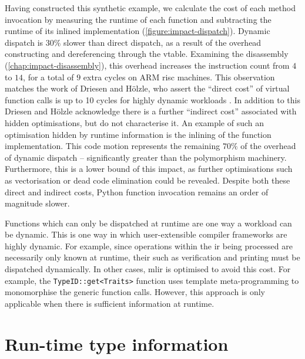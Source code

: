 Having constructed this synthetic example, we calculate the cost of each method invocation by measuring the runtime of each function and subtracting the runtime of its inlined implementation (\autoref{figure:impact-dispatch}).
Dynamic dispatch is $30\%$ slower than direct dispatch, as a result of the overhead constructing and dereferencing through the \ac{vtable}. Examining the disassembly (\autoref{chap:impact-disassembly}), this overhead increases the instruction count from $4$ to $14$, for a total of $9$ extra cycles on ARM \ac{risc} machines. This observation matches the work of Driesen and H\"olzle, who assert the ``direct cost'' of virtual function calls is up to 10 cycles for highly dynamic workloads \cite[Figure 18.]{driesenDirectCostVirtual1996}.
In addition to this Driesen and H\"olzle acknowledge there is a further ``indirect cost'' associated with hidden optimisations, but do not characterise it.
An example of such an optimisation hidden by runtime information is the inlining of the function implementation. This code motion represents the remaining $70\%$ of the overhead of dynamic dispatch -- significantly greater than the polymorphism machinery. Furthermore, this is a lower bound of this impact, as further optimisations such as vectorisation or dead code elimination could be revealed.
Despite both these direct and indirect costs, Python function invocation remains an order of magnitude slower.


Functions which can only be dispatched at runtime are one way a workload can be dynamic.
This is one way in which user-extensible compiler frameworks are highly dynamic. For example, since operations within the \ac{ir} being processed are necessarily only known at runtime, their such as verification and printing must be dispatched dynamically.
In other cases, \ac{mlir} is optimised to avoid this cost. For example, the \texttt{TypeID::get<Traits>} function uses template meta-programming to monomorphise the generic function calls. However, this approach is only applicable when there is sufficient information at runtime.




\section{Run-time type information}
\label{sec:dynamism-pattern-rewriting-rtti}

